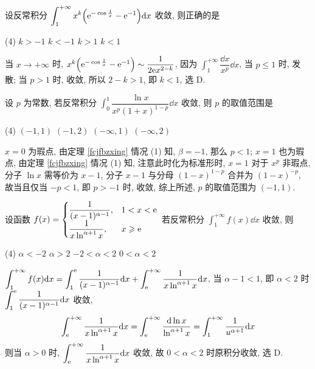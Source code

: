 \begin{example}
    设反常积分 $\displaystyle \int_{1}^{+\infty} x^{k}\qty(\mathrm{e} ^{-\cos \frac{1}{x}}-\mathrm{e} ^{-1}) \dd x$ 收敛, 则正确的是 
    \begin{tasks}(4)
        \task $k>-1$
        \task $k<-1$
        \task $k>1$
        \task $k<1$
    \end{tasks}
\end{example}
\begin{solution}
    当 $x\to+\infty$ 时, $x^{k}\qty(\mathrm{e} ^{-\cos \frac{1}{x}}-\mathrm{e} ^{-1})\sim \dfrac{1}{2\mathrm{e} x^{2-k}}$, 
    因为 $\displaystyle \int_{1}^{+\infty} \dfrac{\dd x}{x^{p}} \dd x$, 当 $p\leqslant 1$ 时, 发散; 当 $p>1$ 时, 收敛, 所以 $2-k>1$, 即 $k<1$, 选 D.
\end{solution}

\begin{example}[2022 数二]
    设 $p$ 为常数, 若反常积分 $\displaystyle \int_{0}^{1} \dfrac{\ln x}{x^{p}(1+x)^{1-p}} \dd x$ 收敛, 则 $p$ 的取值范围是
    \begin{tasks}(4)
        \task $(-1,1)$
        \task $(-1,2)$
        \task $(-\infty,1)$
        \task $(-\infty,2)$
    \end{tasks}
\end{example}
\begin{solution}
    $x=0$ 为瑕点, 由定理 \ref{fcjfbzxing} 情况 (1) 知, $\beta=-1$, 那么 $p<1$; $x=1$ 也为瑕点, 由定理 \ref{fcjfbzxing} 情况 (1) 知, 注意此时化为标准形时, $x=1$ 对于 $x^{p}$ 非瑕点, 分子 $\ln x$ 需等价为 $x-1$, 分子 $x-1$ 与分母 $(1-x)^{1-p}$ 合并为 $(1-x)^{-p}$, 故当且仅当 $-p<1$, 即 $p>-1$ 时, 收敛, 综上所述, $p$ 的取值范围为 $(-1,1).$
\end{solution}

\begin{example}
    设函数 $f(x)=\begin{cases}
        \displaystyle \dfrac{1}{(x-1)^{\alpha-1}},&1<x<\mathrm{e} \\ 
        \displaystyle \dfrac{1}{x\ln^{\alpha+1}x},&x\geqslant \mathrm{e}
    \end{cases}$ 若反常积分 $\displaystyle \int_{1}^{+\infty} f(x) \dd x$ 收敛, 则 
    \begin{tasks}(4)
        \task $\alpha<-2$
        \task $\alpha>2$
        \task $-2<\alpha<2$
        \task $0<\alpha<2$
    \end{tasks}
\end{example}
\begin{solution}
    $ \displaystyle \int_{1}^{+\infty} f(x) \dd x=\int_{1}^{\mathrm{e} } \dfrac{1}{(x-1)^{\alpha-1}} \dd x+\int_{\mathrm{e} }^{+\infty} \dfrac{1}{x\ln^{\alpha+1}x} \dd x $, 当 $\alpha-1<1$, 即 $\alpha<2$ 时 $\displaystyle \int_{1}^{\mathrm{e} } \dfrac{1}{(x-1)^{\alpha-1}} \dd x$ 收敛, 
    $$
    \int_{\mathrm{e} }^{+\infty} \dfrac{1}{x\ln ^{\alpha+1}x} \dd x=\int_{\mathrm{e} }^{+\infty} \dfrac{\dd \ln x}{\ln ^{\alpha+1}x} = \int_{1}^{+\infty} \dfrac{1}{u^{\alpha+1}} \dd x
    $$
    则当 $\alpha>0$ 时, $\displaystyle \int_{\mathrm{e} }^{+\infty} \dfrac{1}{x\ln ^{\alpha+1}x} \dd x$ 收敛, 故 $0<\alpha<2$ 时原积分收敛, 选 D.
\end{solution}

